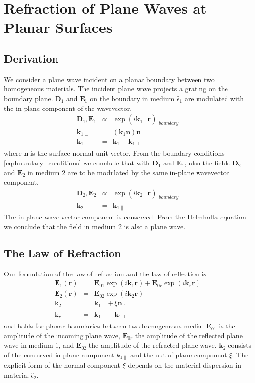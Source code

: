 \documentclass[12pt,a4paper,twoside,openright,BCOR10mm,headsepline,titlepage,abstracton,chapterprefix,final]{scrreprt}
\newcommand\Vector[1]{{\mathbf{#1}}}
\newcommand\Location{\Vector{r}}
\newcommand\wavenumber{k}
\newcommand\Wavevector{\Vector{\wavenumber}}
\newcommand\Tensor[1]{\hat{#1}}
\newcommand\scalarEfield{E}
\newcommand\scalarDfield{D}
\newcommand\Efield{\Vector{\scalarEfield}}
\newcommand\Dfield{\Vector{\scalarDfield}}
\newcommand\permittivity{\Tensor{\epsilon}}
\begin{document}
\section{Refraction of Plane Waves at Planar Surfaces}

\subsection{Derivation}
We consider a plane wave incident on a planar boundary between two homogeneous materials.
The incident plane wave projects a grating on the boundary plane. $\Dfield_1$ and $\Efield_1$ on the boundary in medium $\permittivity_1$ are modulated with the in-plane component of the wavevector. 
\begin{eqnarray}
 \Dfield_1, \Efield_1 &\propto& \exp( i \Wavevector_{1\parallel} \Location)|_{boundary} \\
 \Wavevector_{1\perp} &=& ( \Wavevector_1 \Vector{n} ) \Vector{n} \\
 \Wavevector_{1\parallel} &=& \Wavevector_1 - \Wavevector_{1\perp}
\end{eqnarray}
where $\Vector{n}$ is the surface normal unit vector.
From the boundary conditions \ref{eq:boundary_conditions} we conclude that with $\Dfield_1$ and $\Efield_1$, also the fields $\Dfield_2$ and $\Efield_2$ in medium 2 are to be modulated by the same in-plane wavevector component.
\begin{eqnarray}
  \Dfield_2, \Efield_2 &\propto& \exp( i \Wavevector_{2\parallel} \Location)|_{boundary} \\
  \Wavevector_{2\parallel} &=& \Wavevector_{1\parallel}
\end{eqnarray}
The in-plane wave vector component is conserved.
From the Helmholtz equation we conclude that the field in medium 2 is also a plane wave. 

\subsection{The Law of Refraction}
Our formulation of the law of refraction and the law of reflection is
\begin{eqnarray}
 \Efield_1(\Location) &=& \Efield_{01} \exp(i \Wavevector_1 \Location) + \Efield_{0r} \exp(i \Wavevector_r \Location)   \\
 \Efield_2(\Location) &=& \Efield_{02} \exp(i \Wavevector_2 \Location) \\
 \Wavevector_{2} &=& \Wavevector_{1\parallel} + \xi \Vector{n}\,.\label{eq:xieqn} \\
 \Wavevector_{r} &=& \Wavevector_{1\parallel} - \Wavevector_{1\perp}
\end{eqnarray}
and holds for planar boundaries between two homogeneous media.
$\Efield_{01}$ is the amplitude of the incoming plane wave, 
$\Efield_{0r}$ the amplitude of the reflected plane wave in medium 1, 
and $\Efield_{02}$ the amplitude of the refracted plane wave.
$\Vector{k}_2$ consists of the conserved in-plane component $\wavenumber_{1\parallel}$ and the out-of-plane component $\xi$. 
The explicit form of the normal component $\xi$ depends on the material dispersion in material $\permittivity_2$. 
\end{document}
